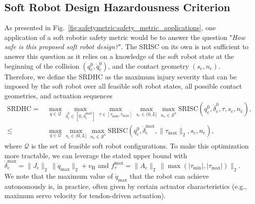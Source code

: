 \subsection{Soft Robot Design Hazardousness Criterion}
As presented in Fig.~\ref{fig:safetymetric:safety_metric_applications}, one application of a soft robotic safety metric would be to answer the question "\emph{How safe is this proposed soft robot design?}". The \gls{SRISC} on its own is not sufficient to answer this question as it relies on a knowledge of the soft robot state at the beginning of the collision $(q_{\mathrm{c}}^0, \dot{q}_{\mathrm{c}}^0)$, and the contact geometry $(s_\mathrm{c},n_\mathrm{c})$.
Therefore, we define the \gls{SRDHC} as the maximum injury severity that can be imposed by the soft robot over all feasible soft robot states, all possible contact geometries, and actuation sequences~\citep{wassink2007towards}
\begin{equation}
\begin{split}
    \mathrm{SRDHC} =& \: \max_{q \in \mathcal{Q}} \max_{\dot{\delta}_\mathrm{c}^0 \in [0,\dot{\delta}_\mathrm{c}^\mathrm{max}]} \max_{\tau \in [\tau_\mathrm{min}, \tau_\mathrm{max}]} \max_{s_\mathrm{c} \in (0,L]} \max_{n_\mathrm{c} \in \mathcal{S}^3} \mathrm{SRISC}(q_{\mathrm{c}}^0,\dot{\delta}_\mathrm{c}^0,\tau,s_\mathrm{c},n_\mathrm{c}),\\
    \leq& \: \max_{q \in \mathcal{Q}} \max_{s_\mathrm{c} \in (0,L]} \max_{n_\mathrm{c} \in \mathcal{S}^3} \mathrm{SRISC}(q_{\mathrm{c}}^0,\dot{\delta}_\mathrm{c}^\mathrm{max},\lVert \tau_\mathrm{max} \rVert_2,s_\mathrm{c},n_\mathrm{c}),
\end{split}
\end{equation}
where $\mathcal{Q}$ is the set of feasible soft robot configurations.
To make this optimization more tractable, we can leverage the stated upper bound with $\dot{\delta}_\mathrm{c}^\mathrm{max} = \lVert J_\mathrm{c} \rVert_2 \, \lVert \dot{q}_\mathrm{max} \rVert_2 + v_\mathrm{H}$
and $f_\tau^\mathrm{max} = \lVert A_\mathrm{c} \rVert_2 \, \lVert \max(|\tau_\mathrm{min}|,|\tau_\mathrm{max}|) \rVert_2$.
We note that the maximum value of $\dot{q}_\mathrm{max}$ that the robot can achieve autonomously is, in practice, often given by certain actuator characteristics (e.g., maximum servo velocity for tendon-driven actuation).

